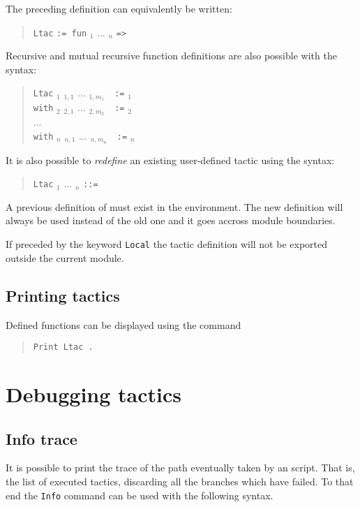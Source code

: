 \Rem The preceding definition can equivalently be written:
\begin{quote}
{\tt Ltac} {\ident} {\tt := fun} {\ident}$_1$ ... {\ident}$_n$
{\tt =>} {\tacexpr}
\end{quote}
Recursive and mutual recursive function definitions are also
possible with the syntax:
\begin{quote}
{\tt Ltac} {\ident}$_1$ {\ident}$_{1,1}$ ...
{\ident}$_{1,m_1}$~~{\tt :=} {\tacexpr}$_1$\\
{\tt with} {\ident}$_2$ {\ident}$_{2,1}$ ... {\ident}$_{2,m_2}$~~{\tt :=}
{\tacexpr}$_2$\\
...\\
{\tt with} {\ident}$_n$ {\ident}$_{n,1}$ ... {\ident}$_{n,m_n}$~~{\tt :=}
{\tacexpr}$_n$
\end{quote}
\medskip
It is also possible to \emph{redefine} an existing user-defined tactic
using the syntax:
\begin{quote}
{\tt Ltac} {\qualid} {\ident}$_1$ ... {\ident}$_n$ {\tt ::=}
{\tacexpr}
\end{quote}
A previous definition of \qualid must exist in the environment.
The new definition will always be used instead of the old one and
it goes accross module boundaries.

If preceded by the keyword {\tt Local} the tactic definition will not
be exported outside the current module.

\subsection[Printing {\ltac} tactics]{Printing {\ltac} tactics}

Defined {\ltac} functions can be displayed using the command

\begin{quote}
{\tt Print Ltac {\qualid}.}
\end{quote}

\section{Debugging {\ltac} tactics}

\subsection[Info trace]{Info trace}

It is possible to print the trace of the path eventually taken by an {\ltac} script. That is, the list of executed tactics, discarding all the branches which have failed. To that end the {\tt Info} command can be used with the following syntax.

